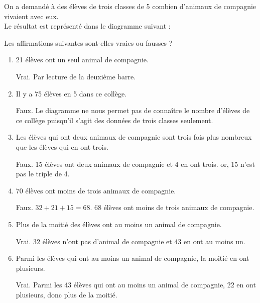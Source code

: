 \begin{corrige}
    On a demandé à des élèves de trois classes de 5 combien d'animaux de compagnie vivaient avec eux. \\
    Le résultat est représenté dans le diagramme suivant :
  
    \smallskip    

    Les affirmations suivantes sont-elles vraies ou fausses ?

    \begin{enumerate}
       \item 21 élèves ont un seul animal de compagnie.
       
       {\red Vrai. Par lecture de la deuxième barre.}
       \item Il y a 75 élèves en 5 dans ce collège.
       
       {\red Faux. Le diagramme ne nous permet pas de connaître le nombre d'élèves de ce collège puisqu'il s'agit des données de trois classes seulement.}
       \item Les élèves qui ont deux animaux de compagnie sont trois fois plus nombreux que les élèves qui en ont trois.
       
       {\red Faux. 15 élèves ont deux animaux de compagnie et  4 en ont trois. or, 15 n'est pas le triple de 4.}
       \item 70 élèves ont moins de trois animaux de compagnie.
       
       {\red Faux. $32+21+15 =68$. 68 élèves ont moins de trois animaux de compagnie.}
       \item Plus de la moitié des élèves ont au moins un animal de compagnie.
       
       {\red Vrai. 32 élèves n'ont pas d'animal de compagnie et 43 en ont au moins un.}
       \item Parmi les élèves qui ont au moins un animal de compagnie, la moitié en ont plusieurs.
       
       {\red Vrai. Parmi les 43 élèves qui ont au moins un animal de compagnie, 22 en ont plusieurs, donc plus de la moitié.}
    \end{enumerate}
\end{corrige}

